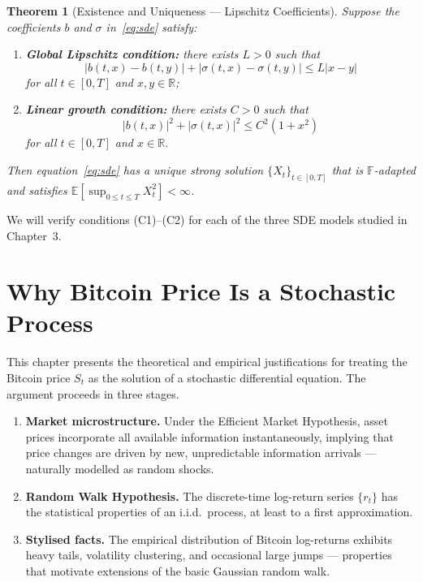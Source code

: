 \documentclass[12pt, a4paper, oneside]{report}
\theoremstyle{plain}
\newtheorem{theorem}{Theorem}[chapter]
\theoremstyle{definition}
\theoremstyle{remark}
\newcommand{\R}{\mathbb{R}}
\newcommand{\E}{\mathbb{E}}
\begin{document}
\begin{theorem}[Existence and Uniqueness --- Lipschitz Coefficients]
\label{thm:sde_exist}
Suppose the coefficients $b$ and $\sigma$ in~\eqref{eq:sde} satisfy:
\begin{enumerate}[leftmargin=1.25cm, label=\textup{(C\arabic*)}]
  \item \textbf{Global Lipschitz condition:} there exists $L > 0$ such that
    \[
      |b(t,x) - b(t,y)| + |\sigma(t,x) - \sigma(t,y)| \leq L|x - y|
    \]
    for all $t \in [0,T]$ and $x, y \in \R$;
  \item \textbf{Linear growth condition:} there exists $C > 0$ such that
    \[
      |b(t,x)|^2 + |\sigma(t,x)|^2 \leq C^2(1 + x^2)
    \]
    for all $t \in [0,T]$ and $x \in \R$.
\end{enumerate}
Then equation~\eqref{eq:sde} has a \emph{unique strong solution} $\{X_t\}_{t \in [0,T]}$
that is $\mathbb{F}$-adapted and satisfies
$\E\!\left[\sup_{0 \leq t \leq T} X_t^2\right] < \infty$.
\end{theorem}

We will verify conditions (C1)--(C2) for each of the three SDE models studied in
Chapter~3.

\chapter{Why Bitcoin Price Is a Stochastic Process}
\label{ch:stochastic}

This chapter presents the theoretical and empirical justifications for treating
the Bitcoin price $S_t$ as the solution of a stochastic differential equation.
The argument proceeds in three stages.

\begin{enumerate}[leftmargin=1.25cm, label=\arabic*.]
  \item \textbf{Market microstructure.}  Under the Efficient Market Hypothesis,
    asset prices incorporate all available information instantaneously, implying
    that price changes are driven by new, unpredictable information arrivals ---
    naturally modelled as random shocks.
  \item \textbf{Random Walk Hypothesis.}  The discrete-time log-return series
    $\{r_t\}$ has the statistical properties of an i.i.d.\ process, at least to
    a first approximation.
  \item \textbf{Stylised facts.}  The empirical distribution of Bitcoin log-returns
    exhibits heavy tails, volatility clustering, and occasional large jumps ---
    properties that motivate extensions of the basic Gaussian random walk.
\end{enumerate}
\end{document}
